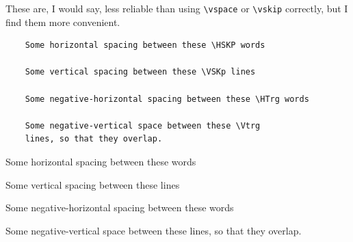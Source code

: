 \documentclass{article}
\begin{document}
These are, I would say, less reliable than using \verb|\vspace| or \verb|\vskip| correctly, but I find them more convenient.
\begin{tcolorbox}
	\begin{Verbatim}
	Some horizontal spacing between these \HSKP words 

	Some vertical spacing between these \VSKp lines 

	Some negative-horizontal spacing between these \HTrg words 
	
	Some negative-vertical space between these \Vtrg
	lines, so that they overlap.
	\end{Verbatim}
	\tcblower
	Some horizontal spacing between these \HSKP words
	
	Some vertical spacing between these \VSKp lines
	
	Some negative-horizontal spacing between these \HTrg words
	
	Some negative-vertical space between these \Vtrg
	lines, so that they overlap.
\end{tcolorbox}
\end{document}
